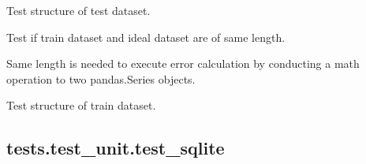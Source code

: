 \documentclass[letterpaper,10pt,english]{sphinxmanual}
\begin{document}
\begin{fulllineitems}
\begin{fulllineitems}
\end{fulllineitems}


\begin{fulllineitems}
\label{\detokenize{_autosummary/tests.test_unit.test_df:tests.test_unit.test_df.test_teststruct}}
\pysigstartsignatures
{}
\pysigstopsignatures
\sphinxAtStartPar
Test structure of test dataset.

\end{fulllineitems}


\begin{fulllineitems}
\label{\detokenize{_autosummary/tests.test_unit.test_df:tests.test_unit.test_df.test_trainideal_length}}
\pysigstartsignatures
{}
\pysigstopsignatures
\sphinxAtStartPar
Test if train dataset and ideal dataset are of same length.

\sphinxAtStartPar
Same length is needed to execute error calculation by conducting a math
operation to two pandas.Series objects.

\end{fulllineitems}


\begin{fulllineitems}
\label{\detokenize{_autosummary/tests.test_unit.test_df:tests.test_unit.test_df.test_trainstruct}}
\pysigstartsignatures
{}
\pysigstopsignatures
\sphinxAtStartPar
Test structure of train dataset.

\end{fulllineitems}


\end{fulllineitems}


\sphinxstepscope


\subsection{tests.test\_unit.test\_sqlite}
\label{\detokenize{_autosummary/tests.test_unit.test_sqlite:tests-test-unit-test-sqlite}}\label{\detokenize{_autosummary/tests.test_unit.test_sqlite::doc}}
\end{document}
